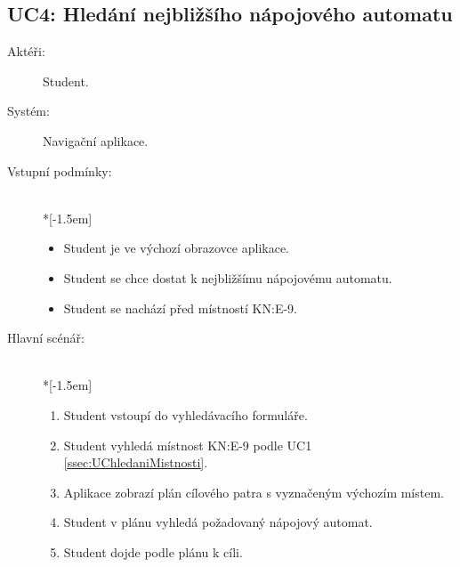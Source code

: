 \subsection{UC4: Hledání nejbližšího nápojového automatu}
\begin{description}
\item[Aktéři:] Student.
\item[Systém:] Navigační aplikace.
\item[Vstupní podmínky:] ~\\*[-1.5em]
 \begin{itemize}
 \item Student je ve výchozí obrazovce aplikace.
 \item Student se chce dostat k nejbližšímu nápojovému automatu.
 \item Student se nachází před místností KN:E-9.
 \end{itemize}
\item[Hlavní scénář:] ~\\*[-1.5em]
 \begin{enumerate}
 \item Student vstoupí do vyhledávacího formuláře.
 \item Student vyhledá místnost KN:E-9 podle UC1 \ref{ssec:UChledaniMistnosti}.
 \item Aplikace zobrazí plán cílového patra s vyznačeným výchozím místem.
 \item Student v plánu vyhledá požadovaný nápojový automat.
 \item Student dojde podle plánu k cíli.
 \end{enumerate}
\end{description}


